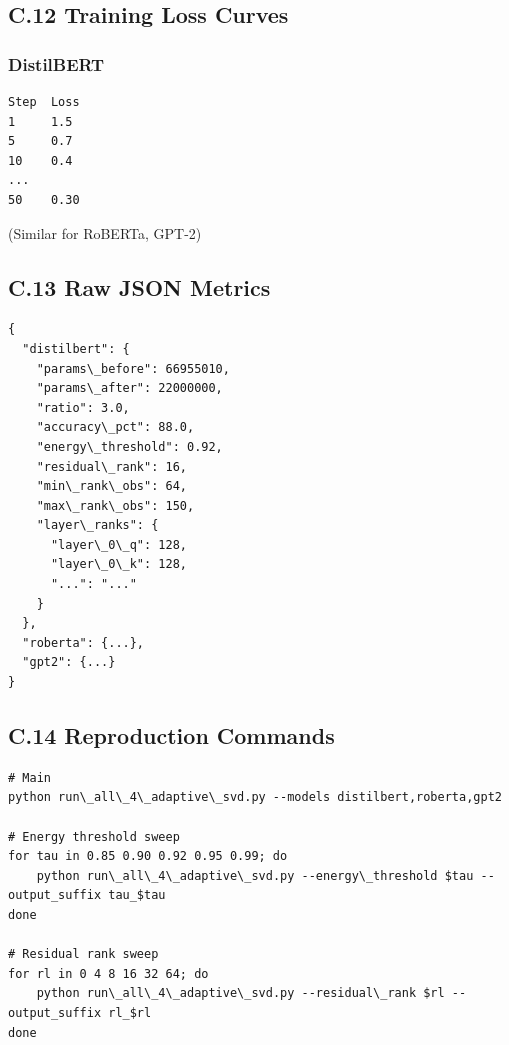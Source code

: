 \subsection{C.12 Training Loss Curves}

\subsubsection{DistilBERT}
\begin{lstlisting}
Step  Loss
1     1.5
5     0.7
10    0.4
...
50    0.30
\end{lstlisting}

(Similar for RoBERTa, GPT-2)

\subsection{C.13 Raw JSON Metrics}

\begin{lstlisting}
{
  "distilbert": {
    "params\_before": 66955010,
    "params\_after": 22000000,
    "ratio": 3.0,
    "accuracy\_pct": 88.0,
    "energy\_threshold": 0.92,
    "residual\_rank": 16,
    "min\_rank\_obs": 64,
    "max\_rank\_obs": 150,
    "layer\_ranks": {
      "layer\_0\_q": 128,
      "layer\_0\_k": 128,
      "...": "..."
    }
  },
  "roberta": {...},
  "gpt2": {...}
}
\end{lstlisting}

\subsection{C.14 Reproduction Commands}

\begin{lstlisting}
# Main
python run\_all\_4\_adaptive\_svd.py --models distilbert,roberta,gpt2

# Energy threshold sweep
for tau in 0.85 0.90 0.92 0.95 0.99; do
    python run\_all\_4\_adaptive\_svd.py --energy\_threshold $tau --output_suffix tau_$tau
done

# Residual rank sweep
for rl in 0 4 8 16 32 64; do
    python run\_all\_4\_adaptive\_svd.py --residual\_rank $rl --output_suffix rl_$rl
done
\end{lstlisting}